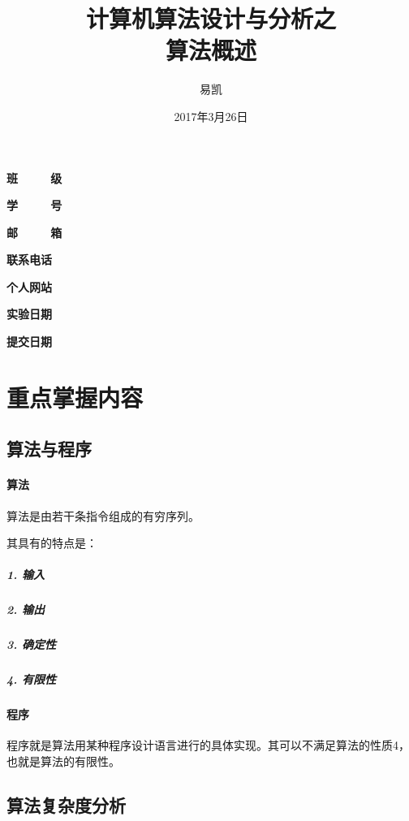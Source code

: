 \documentclass[UTF8]{ctexart}
\title{\Huge{计算机算法设计与分析之\\ 算法概述}}
\author{\Huge{易凯}}
\date{\Huge{2017年3月26日}}
\begin{document}
	\maketitle
	\vspace{35mm}
	\begin{flushright}
	\Large{
  	\textbf{班\ \ \ \ \ 级} 

  	\textbf{学\ \ \ \ \ 号} 

  	\textbf{邮\ \ \ \ \ 箱} 

  	\textbf{联系电话} 

  	\textbf{个人网站} 

	
	  \textbf{实验日期} 

  	\textbf{提交日期} 
  	}
  	\end{flushright}

  	\newpage
  	\tableofcontents
  	\newpage

    \section{重点掌握内容}
    \subsection{算法与程序}
    \paragraph{算法}

    算法是由若干条指令组成的有穷序列。

    其具有的特点是：

    \subparagraph{1. 输入}
    \subparagraph{2. 输出}
    \subparagraph{3. 确定性}
    \subparagraph{4. 有限性}

    \paragraph{程序}

    程序就是算法用某种程序设计语言进行的具体实现。其可以不满足算法的性质4，也就是算法的有限性。

    \subsection{算法复杂度分析}
\end{document}

